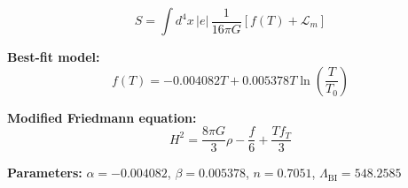 
\begin{equation}
  S = \int d^4x \, |e| \, \frac{1}{16\pi G} \left[ f(T) + \mathcal{L}_m \right]
\end{equation}

\textbf{Best-fit model:}
\begin{equation}
  f(T) = -0.004082 T + 0.005378 T \ln\!\left(\frac{T}{T_0}\right)
\end{equation}

\textbf{Modified Friedmann equation:}
\begin{equation}
  H^2 = \frac{8\pi G}{3} \rho - \frac{f}{6} + \frac{T f_T}{3}
\end{equation}

\textbf{Parameters:}
$\alpha = -0.004082$, \quad
$\beta = 0.005378$, \quad
$n = 0.7051$, \quad
$\Lambda_{\text{BI}} = 548.2585$